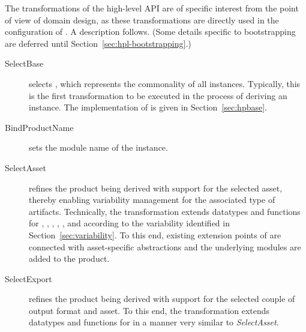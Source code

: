 The transformations of the high-level API are of specific interest from the point of view of domain design, as these transformations are directly used in the configuration of \hpl. A description follows. (Some details specific to bootstrapping are deferred until Section~\ref{sec:hpl-bootstrapping}.)

\begin{description}

\item[SelectBase] selects \hpbase{}, which represents the commonality of all \hpl{} instances.
Typically, this is the first transformation to be executed in the process of deriving an instance. The implementation of \hpbase{} is given in Section~\ref{sec:hpbase}.

\item[BindProductName] sets the module name of the \hpl{} instance.

\item[SelectAsset] refines the product being derived with support for the selected asset, thereby enabling variability management for the associated type of artifacts. Technically, the transformation extends datatypes and functions for \assetr, \assetx, \asseti, \assetc, \emptyi, and \ckparser{} according to the variability identified in Section~\ref{sec:variability}. To this end, existing extension points of \hpbase{} are connected with asset-specific abstractions and the underlying modules are added to the product.

\item[SelectExport] refines the product being derived with support for the selected couple of output format and asset. To this end, the transformation extends datatypes and functions for \asseto{} in a manner very similar to \emph{SelectAsset}. 

\end{description}


